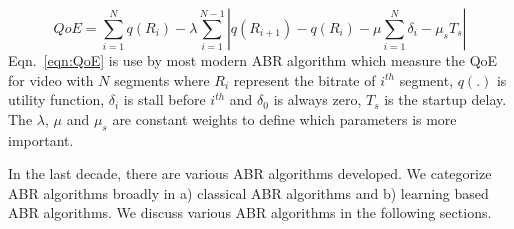 \begin{equation}
	\label{eqn:QoE}
	QoE = \sum_{i=1}^N q(R_i) - \lambda\sum_{i=1}^{N-1}\left|q(R_{i+1})-q(R_i) - \mu\sum_{i=1}^N \delta_i - \mu_s T_s\right|
\end{equation}
Eqn.~\ref{eqn:QoE} is use by most modern ABR algorithm which measure the QoE for video with $N$ segments where $R_i$ represent the bitrate of $i^{th}$ segment, $q(.)$ is utility function, $\delta_i$ is stall before $i^{th}$ and $\delta_0$ is always zero, $T_s$ is the startup delay. The $\lambda$, $\mu$ and $\mu_s$ are constant weights to define which parameters is more important.

In the last decade, there are various ABR algorithms developed. We categorize ABR algorithms broadly in a) classical ABR algorithms and b) learning based ABR algorithms. We discuss various ABR algorithms in the following sections.

%
%
